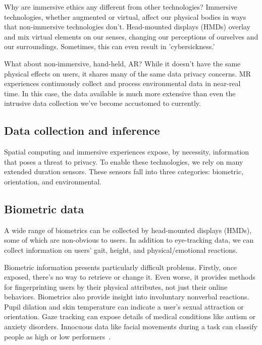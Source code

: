 Why are immersive ethics any different from other technologies? Immersive technologies, whether augmented or virtual, affect our physical bodies in ways that non-immersive technologies don't. Head-mounted displays (HMDs) overlay and mix virtual elements on our senses, changing our perceptions of ourselves and our surroundings. Sometimes, this can even result in 'cybersickness.'

What about non-immersive, hand-held, AR? While it doesn't have the same physical effects on users, it shares many of the same data privacy concerns. MR experiences continuously collect and process environmental data in near-real time. In this case, the data available is much more extensive than even the intrusive data collection we've become accustomed to currently.

\subsection{Data collection and inference}
Spatial computing and immersive experiences expose, by necessity, information that poses a threat to privacy. To enable these technologies, we rely on many extended duration sensors. These sensors fall into three categories: biometric, orientation, and environmental.

\subsection{Biometric data}\label{sec:biometrics}
A wide range of biometrics can be collected by head-mounted displays (HMDs), some of which are non-obvious to users. In addition to eye-tracking data, we can collect information on users' gait, height, and physical/emotional reactions.

Biometric information presents particularly difficult problems. Firstly, once exposed, there's no way to retrieve or change it. Even worse, it provides methods for fingerprinting users by their physical attributes, not just their online behaviors. Biometrics also provide insight into involuntary nonverbal reactions\cite{bailenson2018protecting}. Pupil dilation and skin temperature can indicate a user's sexual attraction or orientation. Gaze tracking can expose details of medical conditions like autism or anxiety disorders. Innocuous data like facial movements during a task can classify people as high or low performers~\cite{jabon2011automatically}.

